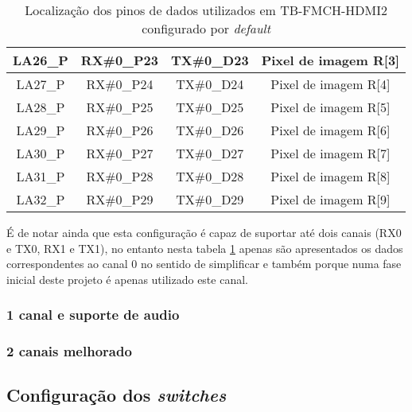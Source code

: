 \begin{table}[h!]
\begin{tabular}{|c|c|c|c|}
		LA26\_P      & RX\#0\_P23                           & TX\#0\_D23                         & Pixel de imagem R{[}3{]} \\ \hline
		LA27\_P      & RX\#0\_P24                           & TX\#0\_D24                         & Pixel de imagem R{[}4{]} \\ \hline
		LA28\_P      & RX\#0\_P25                           & TX\#0\_D25                         & Pixel de imagem R{[}5{]} \\ \hline
		LA29\_P      & RX\#0\_P26                           & TX\#0\_D26                         & Pixel de imagem R{[}6{]} \\ \hline
		LA30\_P      & RX\#0\_P27                           & TX\#0\_D27                         & Pixel de imagem R{[}7{]} \\ \hline
		LA31\_P      & RX\#0\_P28                           & TX\#0\_D28                         & Pixel de imagem R{[}8{]} \\ \hline
		LA32\_P      & RX\#0\_P29                           & TX\#0\_D29                         & Pixel de imagem R{[}9{]} \\ \hline
	\end{tabular}
	\caption{Localização dos pinos de dados utilizados em TB-FMCH-HDMI2 configurado por \textit{default}}
	\label{table:HDMIdataDefaultdetail}
\end{table}

É de notar ainda que esta configuração é capaz de suportar até dois canais (RX0 e TX0, RX1 e TX1), no entanto nesta tabela \ref{table:HDMIdataDefaultdetail} apenas são apresentados os dados correspondentes ao canal 0 no sentido de simplificar e também porque numa fase inicial deste projeto é apenas utilizado este canal.
\subsubsection{1 canal e suporte de audio} \label {subsubsec:HDMIconfig+audio}
\subsubsection{2 canais melhorado} \label{subsubsec:HDMIconfigMelhorado}

\subsection{Configuração dos \textit{switches}}